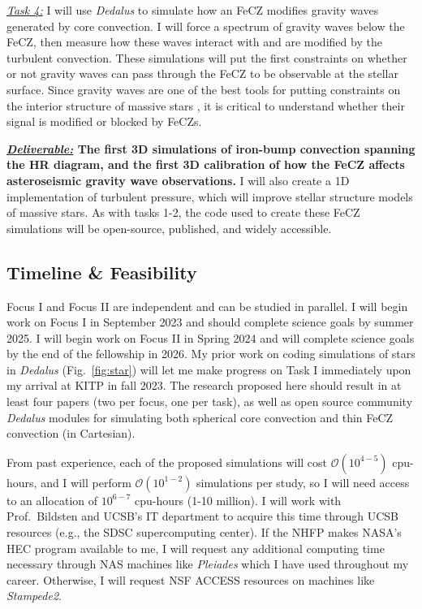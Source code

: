 \documentclass[12pt]{article} %
\begin{document}
\emph{\underline{Task 4:}} I will use \emph{Dedalus} to simulate how an FeCZ modifies gravity waves generated by core convection.
I will force a spectrum of gravity waves below the FeCZ, then measure how these waves interact with and are modified by the turbulent convection.
These simulations will put the first constraints on whether or not gravity waves can pass through the FeCZ to be observable at the stellar surface.
Since gravity waves are one of the best tools for putting constraints on the interior structure of massive stars \citep{aerts2010}, it is critical to understand whether their signal is modified or blocked by FeCZs.

\textbf{\underline{\emph{Deliverable:}} The first 3D simulations of iron-bump convection spanning the HR diagram, and the first 3D calibration of how the FeCZ affects asteroseismic gravity wave observations.}
I will also create a 1D implementation of turbulent pressure, which will improve stellar structure models of massive stars.
As with tasks 1-2, the code used to create these FeCZ simulations will be open-source, published, and widely accessible.


\subsection{Timeline \& Feasibility} \vspace{-0.15cm}
Focus I and Focus II are independent and can be studied in parallel.
I will begin work on Focus I in September 2023 and should complete science goals by summer 2025.
I will begin work on Focus II in Spring 2024 and will complete science goals by the end of the fellowship in 2026.
My prior work on coding simulations of stars in \emph{Dedalus} (Fig.~\ref{fig:star}) will let me make progress on Task I immediately upon my arrival at KITP in fall 2023.
The research proposed here should result in at least four papers (two per focus, one per task), as well as open source community \emph{Dedalus} modules for simulating both spherical core convection and thin FeCZ convection (in Cartesian).

From past experience, each of the proposed simulations will cost $\mathcal{O}(10^{4-5})$ cpu-hours, and I will perform $\mathcal{O}(10^{1-2})$ simulations per study, so I will need access to an allocation of $10^{6-7}$ cpu-hours (1-10 million).
I will work with Prof.~Bildsten and UCSB's IT department to acquire this time through UCSB resources (e.g., the SDSC supercomputing center).
If the NHFP makes NASA's HEC program available to me, I will request any additional computing time necessary through NAS machines like \emph{Pleiades} which I have used throughout my career.
Otherwise, I will request NSF ACCESS resources on machines like \emph{Stampede2}. 
\end{document}
